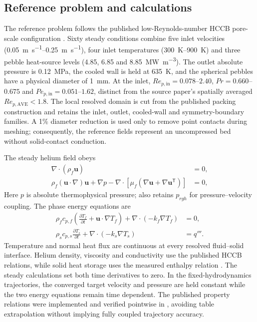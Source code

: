 \subsection{Reference problem and calculations}

The reference problem follows the published low-Reynolds-number HCCB
pore-scale configuration \cite{wang2023pore,wang2024macro}. Sixty steady
conditions combine five inlet velocities
(\SIrange{0.05}{0.25}{m.s^{-1}}), four inlet temperatures
(\SIrange{300}{900}{K}) and three pebble heat-source levels
(4.85, 6.85 and \SI{8.85}{MW.m^{-3}}). The outlet absolute pressure is
\SI{0.12}{MPa}, the cooled wall is held at \SI{635}{K}, and the spherical
\LiSi{} pebbles have a physical diameter of \SI{1}{mm}. At the inlet,
$Re_{p,\mathrm{in}}=0.078$--$2.40$, $Pr=0.660$--$0.675$ and
$Pe_{p,\mathrm{in}}=0.051$--$1.62$, distinct from the source paper's spatially
averaged $Re_{p,\mathrm{AVE}}<1.8$. The local resolved
domain is cut from the published packing construction and retains the inlet,
outlet, cooled-wall and symmetry-boundary families. A 1\% diameter reduction
is used only to remove point contacts during meshing; consequently, the
reference fields represent an uncompressed bed without solid-contact
conduction.

The steady helium field obeys
\begin{align}
\nabla\cdot(\rho_f\mathbf{u}) &= 0,\\
\rho_f(\mathbf{u}\cdot\nabla)\mathbf{u}
 +\nabla p-\nabla\cdot\!\left[
\mu_f(\nabla\mathbf{u}+\nabla\mathbf{u}^{\mathsf T})\right]&=0,
\end{align}
Here $p$ is absolute thermophysical pressure; \OpenFOAM{} also retains
$p_{rgh}$ for pressure--velocity coupling.
The phase energy equations are
\begin{align}
\rho_fc_{p,f}\left(\frac{\partial T_f}{\partial t}
 +\mathbf{u}\cdot\nabla T_f\right)
 +\nabla\cdot(-k_f\nabla T_f)&=0,\\
\rho_sc_{p,s}\frac{\partial T_s}{\partial t}
 +\nabla\cdot(-k_s\nabla T_s)&=q'''.
\end{align}
Temperature and normal heat flux are continuous at every resolved
fluid--solid interface. Helium density, viscosity and conductivity use the
published HCCB relations, while solid heat storage uses the measured
\LiSi{} enthalpy relation \cite{wang2024macro,kleykamp1996enthalpy}.
The steady calculations set both time derivatives to zero.  In the
fixed-hydrodynamics trajectories, the converged target velocity and pressure
are held constant while the two energy equations remain time dependent.
The published property relations were implemented and verified pointwise in
\OpenFOAM{}, avoiding table extrapolation without implying fully coupled
trajectory accuracy.

